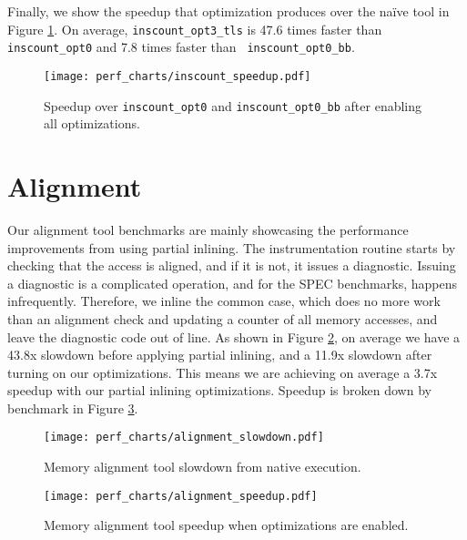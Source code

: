 Finally, we show the speedup that optimization produces over the na\"ive tool in
Figure \ref{fig:inscount_speedup}.  On average, {\tt inscount\_opt3\_tls} is
47.6 times faster than {\tt inscount\_opt0} and 7.8 times faster than {\tt
inscount\_opt0\_bb}.

\begin{figure}
\texttt{[image: perf\_charts/inscount\_speedup.pdf]}
\caption{Speedup over {\tt inscount\_opt0} and {\tt inscount\_opt0\_bb} after
enabling all optimizations.}
\label{fig:inscount_speedup}
\end{figure}

\section{Alignment}

Our alignment tool benchmarks are mainly showcasing the performance improvements
from using partial inlining.  The instrumentation routine starts by checking
that the access is aligned, and if it is not, it issues a diagnostic.  Issuing a
diagnostic is a complicated operation, and for the SPEC benchmarks, happens
infrequently.  Therefore, we inline the common case, which does no more work
than an alignment check and updating a counter of all memory accesses, and leave
the diagnostic code out of line.  As shown in Figure
\ref{fig:alignment_slowdown}, on average we have a 43.8x slowdown before
applying partial inlining, and a 11.9x slowdown after turning on our
optimizations.  This means we are achieving on average a 3.7x speedup with our
partial inlining optimizations.  Speedup is broken down by benchmark in Figure
\ref{fig:alignment_speedup}.



\begin{figure}
\texttt{[image: perf\_charts/alignment\_slowdown.pdf]}
\caption{Memory alignment tool slowdown from native execution.}
\label{fig:alignment_slowdown}
\end{figure}

\begin{figure}
\texttt{[image: perf\_charts/alignment\_speedup.pdf]}
\caption{Memory alignment tool speedup when optimizations are enabled.}
\label{fig:alignment_speedup}
\end{figure}

